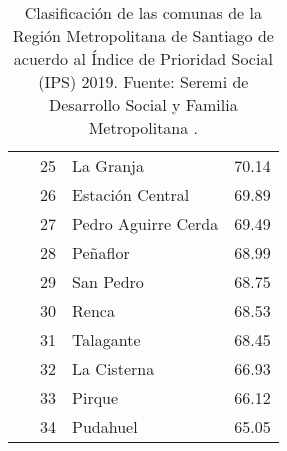 \begin{table*}[!ht]
{\begin{tabular}{||c|l|l|l||}
        ~ & 25 & La Granja & 70.14 \\ 
        ~ & 26 & Estación Central & 69.89 \\ 
        ~ & 27 & Pedro Aguirre Cerda & 69.49 \\ 
        ~ & 28 & Peñaflor & 68.99 \\ 
        ~ & 29 & San Pedro & 68.75 \\ 
        ~ & 30 & Renca & 68.53 \\ 
        ~ & 31 & Talagante & 68.45 \\ 
        ~ & 32 & La Cisterna & 66.93 \\ 
        ~ & 33 & Pirque & 66.12 \\ 
        ~ & 34 & Pudahuel & 65.05 \\ \hline
    \end{tabular}}
    \,
    \caption[Clasificación de las comunas de la RM por IPS 2019]{Clasificación de las comunas de la Región Metropolitana de Santiago de acuerdo al Índice de Prioridad Social (IPS) 2019. Fuente: Seremi de Desarrollo Social y Familia Metropolitana \cite{SEREMIRM2019}.}
    \label{table:ipsfull}
\end{table*}
